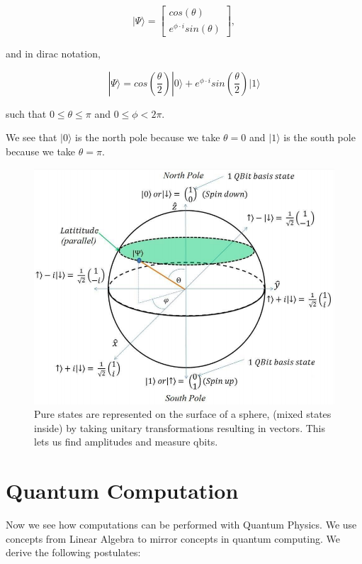 \documentclass[letterpaper, 10 pt, conference]{ieeeconf}
\begin{document}
\[
|\Psi\rangle =
\begin{bmatrix} cos(\theta) \\ e^{\phi \cdot i} sin(\theta) \end{bmatrix},
\]

and in dirac notation,

\[
|\Psi\rangle = cos(\frac{\theta}{2}) |0\rangle + e^{\phi \cdot i} sin(\frac{\theta}{2}) |1\rangle
\]

such that \( 0 \leq \theta \leq \pi \) and \( 0 \leq \phi < 2\pi \).

We see that \( |0\rangle \) is the north pole because we take \( \theta = 0 \) and \( |1\rangle \) is the south pole because we take \( \theta = \pi \).

\begin{figure}[h!]
    \includegraphics[width=\linewidth]{sphere.png}
    \caption{Pure states are represented on the surface of a sphere, (mixed states inside) by taking unitary transformations resulting in vectors.  This lets us find amplitudes and measure qbits.}
\end{figure}

\section{Quantum Computation}

Now we see how computations can be performed with Quantum Physics.  We use concepts from Linear Algebra to mirror concepts in quantum computing.  We derive the following postulates:
\end{document}
